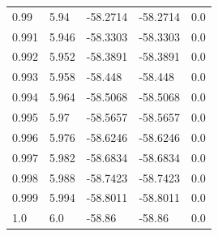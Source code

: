 \begin{table}[H]
\begin{tabular}{lllll}
0.99 & 5.94 & -58.2714 & -58.2714 & 0.0 \\
0.991 & 5.946 & -58.3303 & -58.3303 & 0.0 \\
0.992 & 5.952 & -58.3891 & -58.3891 & 0.0 \\
0.993 & 5.958 & -58.448 & -58.448 & 0.0 \\
0.994 & 5.964 & -58.5068 & -58.5068 & 0.0 \\
0.995 & 5.97 & -58.5657 & -58.5657 & 0.0 \\
0.996 & 5.976 & -58.6246 & -58.6246 & 0.0 \\
0.997 & 5.982 & -58.6834 & -58.6834 & 0.0 \\
0.998 & 5.988 & -58.7423 & -58.7423 & 0.0 \\
0.999 & 5.994 & -58.8011 & -58.8011 & 0.0 \\
1.0 & 6.0 & -58.86 & -58.86 & 0.0 \\
\bottomrule
\end{tabular}

\end{table}
